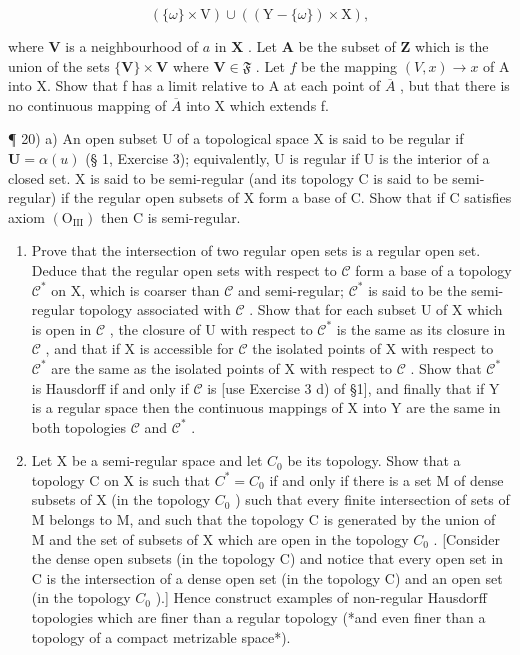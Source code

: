 \[
(\{\omega \} \times \mathrm{V}) \cup ((\mathrm{Y} - \{\omega \}) \times \mathrm{X}),
\]

where \(\mathbf{V}\) is a neighbourhood of \(a\) in \(\mathbf{X}\) . Let \(\mathbf{A}\) be the subset of \(\mathbf{Z}\) which is the union of the sets \(\{\mathbf{V}\} \times \mathbf{V}\) where \(\mathbf{V} \in \mathfrak{F}\) . Let \(f\) be the mapping \((V, x) \rightarrow x\) of A into X. Show that f has a limit relative to A at each point of \(\overline{A}\) , but that there is no continuous mapping of \(\overline{A}\) into X which extends f.

¶ 20) a) An open subset U of a topological space X is said to be regular if \(\mathbf{U} = \alpha(u)\) (§ 1, Exercise 3); equivalently, U is regular if U is the interior of a closed set. X is said to be semi-regular (and its topology C is said to be semi-regular) if the regular open subsets of X form a base of C. Show that if C satisfies axiom \((\mathrm{O}_{\mathrm{III}})\) then C is semi-regular.

\begin{enumerate}
\def\labelenumi{\alph{enumi})}
\setcounter{enumi}{1}
\item
  Prove that the intersection of two regular open sets is a regular open set. Deduce that the regular open sets with respect to \(\mathcal{C}\) form a base of a topology \(\mathcal{C}^*\) on X, which is coarser than \(\mathcal{C}\) and semi-regular; \(\mathcal{C}^*\) is said to be the semi-regular topology associated with \(\mathcal{C}\) . Show that for each subset U of X which is open in \(\mathcal{C}\) , the closure of U with respect to \(\mathcal{C}^*\) is the same as its closure in \(\mathcal{C}\) , and that if X is accessible for \(\mathcal{C}\) the isolated points of X with respect to \(\mathcal{C}^*\) are the same as the isolated points of X with respect to \(\mathcal{C}\) . Show that \(\mathcal{C}^*\) is Hausdorff if and only if \(\mathcal{C}\) is {[}use Exercise 3 d) of §1{]}, and finally that if Y is a regular space then the continuous mappings of X into Y are the same in both topologies \(\mathcal{C}\) and \(\mathcal{C}^*\) .
\item
  Let X be a semi-regular space and let \(C_{0}\) be its topology. Show that a topology C on X is such that \(C^{*} = C_{0}\) if and only if there is a set M of dense subsets of X (in the topology \(C_{0}\) ) such that every finite intersection of sets of M belongs to M, and such that the topology C is generated by the union of M and the set of subsets of X which are open in the topology \(C_{0}\) . {[}Consider the dense open subsets (in the topology C) and notice that every open set in C is the intersection of a dense open set (in the topology C) and an open set (in the topology \(C_{0}\) ).{]} Hence construct examples of non-regular Hausdorff topologies which are finer than a regular topology (*and even finer than a topology of a compact metrizable space*).
\end{enumerate}

